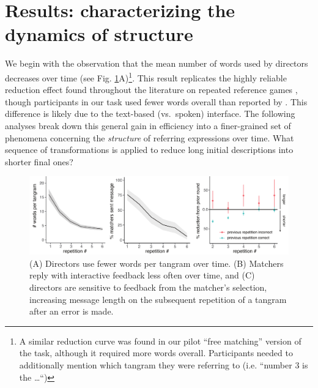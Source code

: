 \documentclass[alpha-refs]{wiley-article}
\begin{document}

\section{Results: characterizing the dynamics of structure}
\label{sec:structure}

We begin with the observation that the mean number of words used by directors decreases over time (see Fig. \ref{fig:feedback}A)\footnote{A similar reduction curve was found in our pilot ``free matching'' version of the task, although it required more words overall. Participants needed to additionally mention which tangram they were referring to (i.e. ``number 3 is the \dots``)}.
This result replicates the highly reliable reduction effect found throughout the literature on repeated reference games \citep[e.g.][]{KraussWeinheimer64_ReferencePhrases,BrennanClark96_ConceptualPactsConversation}, though
participants in our task used fewer words overall than reported by \cite{ClarkWilkesGibbs86_ReferringCollaborative}. 
This difference is likely due to the text-based (vs.~spoken) interface.
The following analyses break down this general gain in efficiency into a finer-grained set of phenomena concerning the \emph{structure} of referring expressions over time.
What sequence of transformations is applied to reduce long initial descriptions into shorter final ones?

\begin{figure}[t]
\centering
\includegraphics[scale=.64]{listenerFeedback_combined.pdf}
\caption{(A) Directors use fewer words per tangram over time. (B) Matchers reply with interactive feedback less often over time, and (C) directors are sensitive to feedback from the matcher's selection, increasing message length on the subsequent repetition of a tangram after an error is made.}
\label{fig:feedback}
\end{figure}
\end{document}
